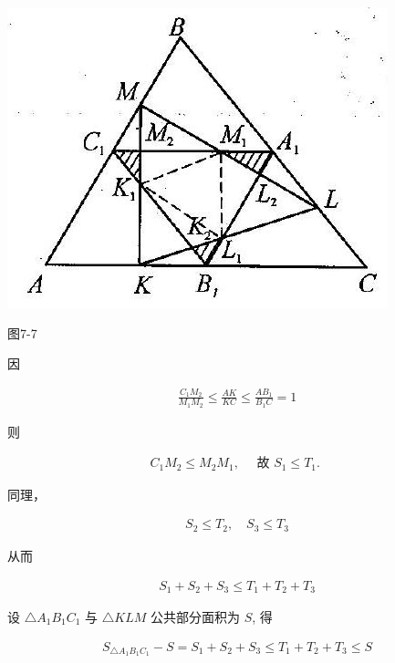 \documentclass[10pt]{article}
\begin{document}
\begin{center}
\includegraphics[max width=\textwidth]{2024_10_30_2c8f45efd4a519b08e1ag-079(1)}
\end{center}

图7-7

因

\begin{align*}
\frac{C_{1} M_{2}}{M_{1} M_{2}} \leqslant \frac{A K}{K C} \leqslant \frac{A B_{1}}{B_{1} C}=1
\end{align*}

则

\begin{align*}
C_{1} M_{2} \leqslant M_{2} M_{1}, \quad \text { 故 } S_{1} \leqslant T_{1} \text {. }
\end{align*}

同理，

\begin{align*}
S_{2} \leqslant T_{2}, \quad S_{3} \leqslant T_{3}
\end{align*}

从而

\begin{align*}
S_{1}+S_{2}+S_{3} \leqslant T_{1}+T_{2}+T_{3}
\end{align*}

设 $\triangle A_{1} B_{1} C_{1}$ 与 $\triangle K L M$ 公共部分面积为 $S$, 得

\begin{align*}
S_{\triangle A_{1} B_{1} C_{1}}-S=S_{1}+S_{2}+S_{3} \leqslant T_{1}+T_{2}+T_{3} \leqslant S
\end{align*}
\end{document}
